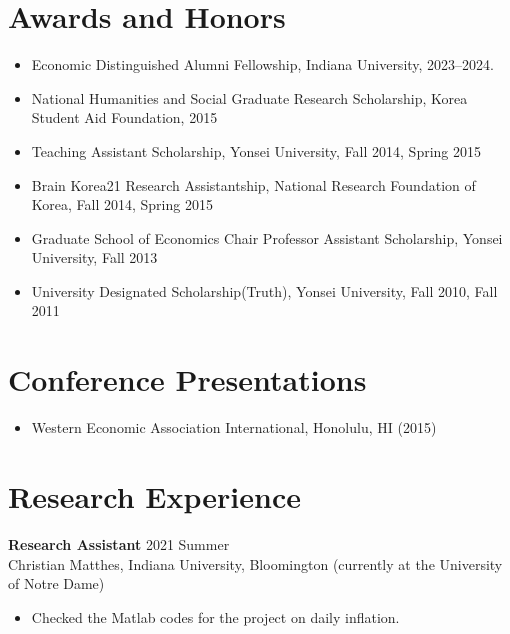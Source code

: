 \documentclass[11pt,a4paper]{article}
\begin{document}
\section*{Awards and Honors}
\begin{itemize}[leftmargin=*]   
\item Economic Distinguished Alumni Fellowship, Indiana University, 2023--2024.    
\item National Humanities and Social Graduate Research Scholarship, Korea Student Aid Foundation, 2015
\item Teaching Assistant Scholarship, Yonsei University, Fall 2014, Spring 2015
\item Brain Korea21 Research Assistantship, National Research Foundation of Korea, Fall 2014, Spring 2015
\item Graduate School of Economics Chair Professor Assistant Scholarship, Yonsei University, Fall 2013
\item University Designated Scholarship(Truth), Yonsei University, Fall 2010, Fall 2011
\end{itemize}

\section*{Conference Presentations}
\begin{itemize}[leftmargin=*]
    \item Western Economic Association International, Honolulu, HI (2015)    
\end{itemize}

\section*{Research Experience}
\textbf{Research Assistant} \hfill 2021 Summer \\
Christian Matthes, Indiana University, Bloomington (currently at the University of Notre Dame)
\begin{itemize}[leftmargin=*]
    \item Checked the Matlab codes for the project on daily inflation.    
\end{itemize}
\end{document}

